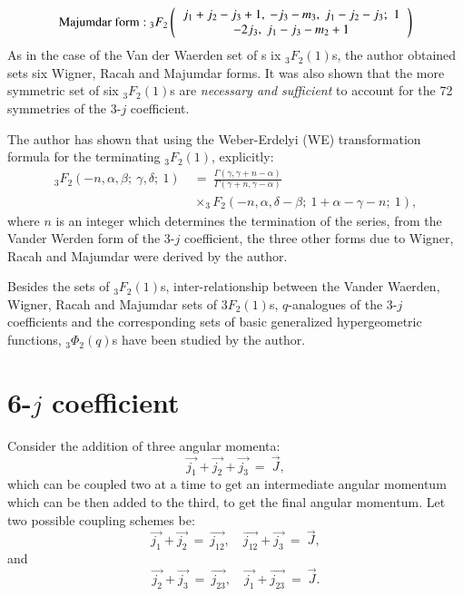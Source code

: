 \smallskip
\begin{equation}
{\rm Majumdar\ form:}\ {}_3F_2
\left(
\begin{tabular}{c}
$j_1+j_2-j_3+1,\ -j_3-m_3,\ j_1-j_2-j_3;$ \ 1\\
$-2j_3,\ j_1-j_3-m_2+1$  \\ 
\end{tabular} 
\right) \label{chap7-eq18}
\end{equation}
As in the case of the Van der Waerden set of s ix $_3F_2(1)$s, the author obtained sets six Wigner, Racah and Majumdar forms. It was also shown that the more symmetric set of six $_3F_2(1)$s are \textit{necessary and sufficient} to account for the 72 symmetries of the 3-$j$ coefficient.

The author has shown that using the Weber-Erdelyi (WE) transformation formula for the terminating $_3F_2(1)$, explicitly:
\begin{equation}
\begin{split}
_3F_2(-n,\alpha,\beta ;\ \gamma,\delta;\ 1)\ & = \ \frac{\Gamma(\gamma, \gamma +n-\alpha )} {\Gamma(\gamma +n, \gamma -\alpha )}\\
& \times _3F_2(-n,\alpha,\delta -\beta;\ 1+\alpha -\gamma -n;\ 1), \label{chap7-eq19}
\end{split}
\end{equation}
where $n$ is an integer which determines the termination of the series, from the Vander Werden form of the 3-$j$ coefficient, the three other forms due to Wigner, Racah and Majumdar were derived by the author.

Besides the sets of $_3F_2(1)$s, inter-relationship between the Vander Waerden, Wigner, Racah and Majumdar sets of $3F_2(1)$s,  $q$-analogues of the 3-$j$ coefficients and the corresponding sets of basic generalized hypergeometric functions, $_3\Phi_2(q)$s have been studied by the author.

\section*{6-$j$ coefficient}

Consider the addition of three angular momenta:
\begin{equation}
\vec{j_1} + \vec{j_2} + \vec{j_3} \ =\ \vec{J}, \label{chap7-eq20}
\end{equation}
which can be coupled two at a time to get an intermediate angular momentum which can be then added to the third, to get the final angular momentum. Let two possible coupling schemes be:
\begin{equation}
\vec{j_1} + \vec{j_2}\ =\ \vec{j_{12}}, \quad  \vec{j_{12}} + \vec{j_3} \ =\ \vec{J}, \label{chap7-eq21}
\end{equation}
and 
\begin{equation}
\vec{j_2} + \vec{j_3}\ =\ \vec{j_{23}}, \quad  \vec{j_1} + \vec{j_{23}} \ =\ \vec{J}. \label{chap7-eq22}
\end{equation}

